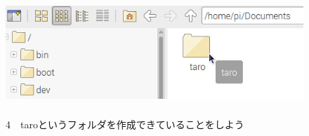 \documentclass[a4paper,12pt]{jarticle}
\begin{document}
\begin{figure}[ht]
  \centering
  \includegraphics[width=12.659cm,height=3.972cm]{textbook-img040.png}
  \begin{minipage}{\textwidth}
    4　taroというフォルダを作成できていることをしよう
  \end{minipage}

\end{figure}
\clearpage
\end{document}
